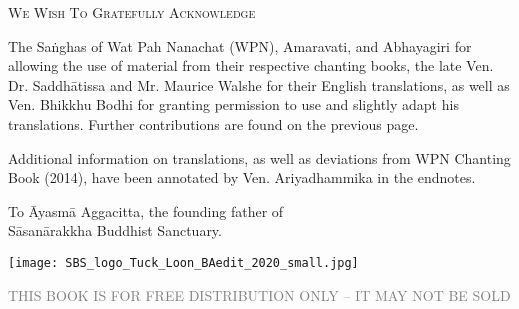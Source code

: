\cleartorecto
\thispagestyle{empty}

{\setlength{\parskip}{10pt}

{\centering\fontsize{16}{25}\selectfont
\textsc{We Wish To Gratefully Acknowledge}
\par}

The Saṅghas of Wat Pah Nanachat (WPN), Amaravati, and Abhayagiri for allowing the use of material from their respective chanting books, the late Ven. Dr. Saddhātissa and Mr. Maurice Walshe for their English translations, as well as Ven. Bhikkhu Bodhi for granting permission to use and slightly adapt his translations. Further contributions are found on the previous page.


Additional information on translations, as well as deviations\hyperlink{endnote1-appendix}{\hypertarget{endnote1-body}{}}
from WPN Chanting Book (2014), have been annotated by Ven. Ariyadhammika in the endnotes.

\medskip

{\centering
To Āyasmā Aggacitta, the founding father of\\
Sāsanārakkha Buddhist Sanctuary.

\medskip

\texttt{[image: SBS\_logo\_Tuck\_Loon\_BAedit\_2020\_small.jpg]}

{\centering\fontsize{10}{30}\selectfont
  \textsc{\textcolor{gray}{THIS BOOK IS FOR FREE DISTRIBUTION ONLY – IT MAY NOT BE SOLD}}
\par}

}

}
